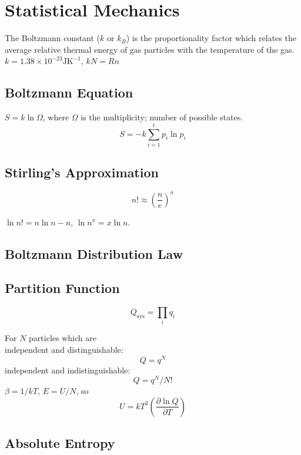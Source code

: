 \pagebreak
\section{Statistical Mechanics}
The Boltzmann constant ($k$ or $k_B$) is the proportionality factor which relates the average relative thermal energy 
of gas particles with the temperature of the gas.
$k = 1.38 \times 10^{-23} \mathrm{J} \mathrm{K}^{-1}$, $kN = Rn$

\subsection*{Boltzmann Equation}
$S = k \ln \Omega$, where $\Omega$ is the multiplicity; number of possible states.
\begin{equation*}
    S = -k \sum_{i = 1}^{t}p_i \ln p_i
\end{equation*}

\subsection*{Stirling's Approximation}
\begin{equation*}
    n! \approx \left(\frac{n}{e}\right)^n
\end{equation*}

$\ln n! = n \ln n - n$, $\ln n^x = x \ln n$.

\subsection*{Boltzmann Distribution Law}

\subsection*{Partition Function}
\begin{equation*}
    Q_{\mathrm{sys}} = \prod_{i} q_i
\end{equation*}

For $N$ particles which are \\
independent and distinguishable: $$Q = q^N$$independent and indistinguishable: $$Q = q^N/N!$$
$\beta = 1/kT$, $E = U/N$, so $$U = kT^2\left(\frac{\partial \ln Q}{\partial T}\right)$$

\subsection*{Absolute Entropy}